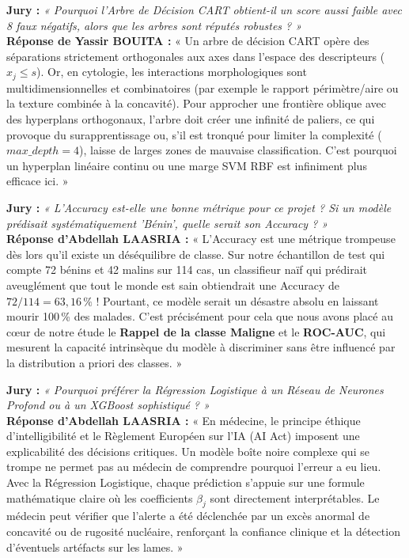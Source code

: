 \documentclass[a4paper,11pt]{article}
\begin{document}
\begin{tcolorbox}[qabox, title={\textbf{Question 4 (Algorithmes d'Arbre) -- Assignée à Yassir BOUITA}}]
	\textbf{Jury :} \textit{« Pourquoi l'Arbre de Décision CART obtient-il un score aussi faible avec 8 faux négatifs, alors que les arbres sont réputés robustes ? »}\\
	\textbf{Réponse de Yassir BOUITA :}
	« Un arbre de décision CART opère des séparations strictement orthogonales aux axes dans l'espace des descripteurs ($x_j \le s$). Or, en cytologie, les interactions morphologiques sont multidimensionnelles et combinatoires (par exemple le rapport périmètre/aire ou la texture combinée à la concavité). Pour approcher une frontière oblique avec des hyperplans orthogonaux, l'arbre doit créer une infinité de paliers, ce qui provoque du surapprentissage ou, s'il est tronqué pour limiter la complexité ($max\_depth=4$), laisse de larges zones de mauvaise classification. C'est pourquoi un hyperplan linéaire continu ou une marge SVM RBF est infiniment plus efficace ici. »
\end{tcolorbox}

\begin{tcolorbox}[qabox, title={\textbf{Question 5 (Métriques \& Déséquilibre) -- Assignée à Abdellah LAASRIA}}]
	\textbf{Jury :} \textit{« L'Accuracy est-elle une bonne métrique pour ce projet ? Si un modèle prédisait systématiquement 'Bénin', quelle serait son Accuracy ? »}\\
	\textbf{Réponse d'Abdellah LAASRIA :}
	« L'Accuracy est une métrique trompeuse dès lors qu'il existe un déséquilibre de classe. Sur notre échantillon de test qui compte 72 bénins et 42 malins sur 114 cas, un classifieur naïf qui prédirait aveuglément que tout le monde est sain obtiendrait une Accuracy de $72 / 114 = 63,16\,\%$ ! Pourtant, ce modèle serait un désastre absolu en laissant mourir 100\,\% des malades. C'est précisément pour cela que nous avons placé au cœur de notre étude le \textbf{Rappel de la classe Maligne} et le \textbf{ROC-AUC}, qui mesurent la capacité intrinsèque du modèle à discriminer sans être influencé par la distribution a priori des classes. »
\end{tcolorbox}

\begin{tcolorbox}[qabox, title={\textbf{Question 6 (Éthique \& Explicabilité) -- Assignée à Abdellah LAASRIA}}]
	\textbf{Jury :} \textit{« Pourquoi préférer la Régression Logistique à un Réseau de Neurones Profond ou à un XGBoost sophistiqué ? »}\\
	\textbf{Réponse d'Abdellah LAASRIA :}
	« En médecine, le principe éthique d'intelligibilité et le Règlement Européen sur l'IA (AI Act) imposent une explicabilité des décisions critiques. Un modèle boîte noire complexe qui se trompe ne permet pas au médecin de comprendre pourquoi l'erreur a eu lieu. Avec la Régression Logistique, chaque prédiction s'appuie sur une formule mathématique claire où les coefficients $\beta_j$ sont directement interprétables. Le médecin peut vérifier que l'alerte a été déclenchée par un excès anormal de concavité ou de rugosité nucléaire, renforçant la confiance clinique et la détection d'éventuels artéfacts sur les lames. »
\end{tcolorbox}
\end{document}
